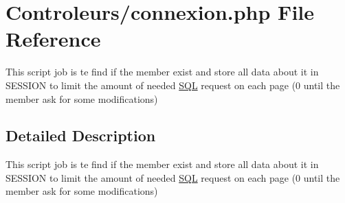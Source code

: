 \hypertarget{connexion_8php}{}\section{Controleurs/connexion.php File Reference}
\label{connexion_8php}


This script job is te find if the member exist and store all data about it in S\+E\+S\+S\+I\+ON to limit the amount of needed \mbox{\hyperlink{classSQL}{S\+QL}} request on each page (0 until the member ask for some modifications)  




\subsection{Detailed Description}
This script job is te find if the member exist and store all data about it in S\+E\+S\+S\+I\+ON to limit the amount of needed \mbox{\hyperlink{classSQL}{S\+QL}} request on each page (0 until the member ask for some modifications) 

